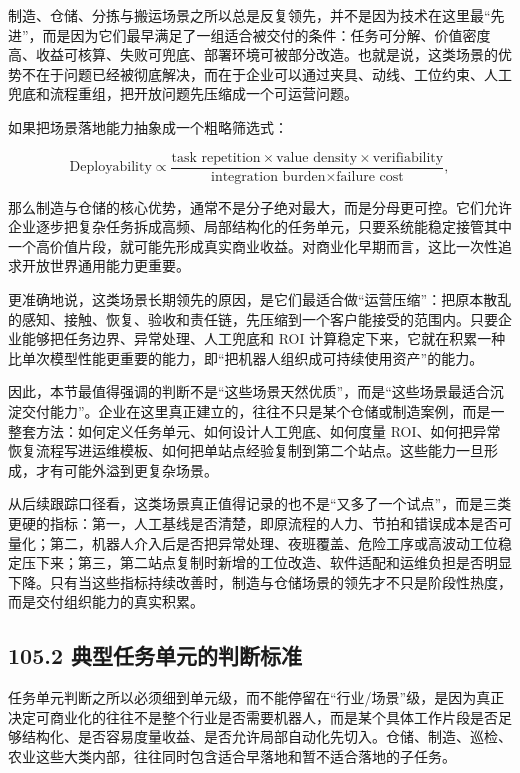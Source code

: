 制造、仓储、分拣与搬运场景之所以总是反复领先，并不是因为技术在这里最“先进”，而是因为它们最早满足了一组适合被交付的条件：任务可分解、价值密度高、收益可核算、失败可兜底、部署环境可被部分改造。也就是说，这类场景的优势不在于问题已经被彻底解决，而在于企业可以通过夹具、动线、工位约束、人工兜底和流程重组，把开放问题先压缩成一个可运营问题。

如果把场景落地能力抽象成一个粗略筛选式：

\begingroup
\scriptsize
\begin{equation*}
\text{Deployability} \propto
\frac{\text{task repetition} \times \text{value density} \times \text{verifiability}}
{\text{integration burden} \times \text{failure cost}},
\end{equation*}
\endgroup

那么制造与仓储的核心优势，通常不是分子绝对最大，而是分母更可控。它们允许企业逐步把复杂任务拆成高频、局部结构化的任务单元，只要系统能稳定接管其中一个高价值片段，就可能先形成真实商业收益。对商业化早期而言，这比一次性追求开放世界通用能力更重要。

更准确地说，这类场景长期领先的原因，是它们最适合做“运营压缩”：把原本散乱的感知、接触、恢复、验收和责任链，先压缩到一个客户能接受的范围内。只要企业能够把任务边界、异常处理、人工兜底和 ROI 计算稳定下来，它就在积累一种比单次模型性能更重要的能力，即“把机器人组织成可持续使用资产”的能力。

因此，本节最值得强调的判断不是“这些场景天然优质”，而是“这些场景最适合沉淀交付能力”。企业在这里真正建立的，往往不只是某个仓储或制造案例，而是一整套方法：如何定义任务单元、如何设计人工兜底、如何度量 ROI、如何把异常恢复流程写进运维模板、如何把单站点经验复制到第二个站点。这些能力一旦形成，才有可能外溢到更复杂场景。

从后续跟踪口径看，这类场景真正值得记录的也不是“又多了一个试点”，而是三类更硬的指标：第一，人工基线是否清楚，即原流程的人力、节拍和错误成本是否可量化；第二，机器人介入后是否把异常处理、夜班覆盖、危险工序或高波动工位稳定压下来；第三，第二站点复制时新增的工位改造、软件适配和运维负担是否明显下降。只有当这些指标持续改善时，制造与仓储场景的领先才不只是阶段性热度，而是交付组织能力的真实积累。

\subsection*{105.2 典型任务单元的判断标准}


任务单元判断之所以必须细到单元级，而不能停留在“行业/场景”级，是因为真正决定可商业化的往往不是整个行业是否需要机器人，而是某个具体工作片段是否足够结构化、是否容易度量收益、是否允许局部自动化先切入。仓储、制造、巡检、农业这些大类内部，往往同时包含适合早落地和暂不适合落地的子任务。

